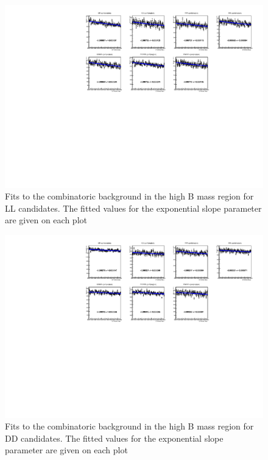 \begin{figure}[h]
\centering
\includegraphics[width=\linewidth]{figures/fitComponents/combinatoricFits_LL.pdf}
\caption{Fits to the combinatoric background in the high B mass region for LL candidates. The fitted values for the exponential slope parameter are given on each plot}
\label{combinatoricLL}
\end{figure}

\begin{figure}[h]
\centering
\includegraphics[width=\linewidth]{figures/fitComponents/combinatoricFits_DD.pdf}
\caption{Fits to the combinatoric background in the high B mass region for DD candidates. The fitted values for the exponential slope parameter are given on each plot}
\label{combinatoricDD}
\end{figure}


